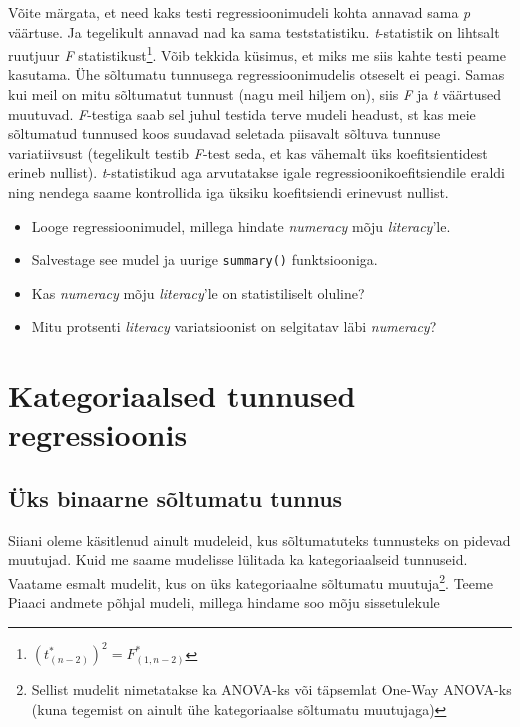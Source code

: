 \documentclass[
]{book}
\providecommand{\tightlist}{%
  \setlength{\itemsep}{0pt}\setlength{\parskip}{0pt}}
\begin{document}
Võite märgata, et need kaks testi regressioonimudeli kohta annavad sama \emph{p} väärtuse. Ja tegelikult annavad nad ka sama teststatistiku. \emph{t}-statistik on lihtsalt ruutjuur \emph{F} statistikust\footnote{\((t^{*}_{(n-2)})^2=F^{*}_{(1,n-2)}\)}. Võib tekkida küsimus, et miks me siis kahte testi peame kasutama. Ühe sõltumatu tunnusega regressioonimudelis otseselt ei peagi. Samas kui meil on mitu sõltumatut tunnust (nagu meil hiljem on), siis \emph{F} ja \emph{t} väärtused muutuvad. \emph{F}-testiga saab sel juhul testida terve mudeli headust, st kas meie sõltumatud tunnused koos suudavad seletada piisavalt sõltuva tunnuse variatiivsust (tegelikult testib \emph{F}-test seda, et kas vähemalt üks koefitsientidest erineb nullist). \emph{t}-statistikud aga arvutatakse igale regressioonikoefitsiendile eraldi ning nendega saame kontrollida iga üksiku koefitsiendi erinevust nullist.

\begin{itemize}
\tightlist
\item
  Looge regressioonimudel, millega hindate \emph{numeracy} mõju \emph{literacy}'le.\\
\item
  Salvestage see mudel ja uurige \texttt{summary()} funktsiooniga.
\item
  Kas \emph{numeracy} mõju \emph{literacy}'le on statistiliselt oluline?\\
\item
  Mitu protsenti \emph{literacy} variatsioonist on selgitatav läbi \emph{numeracy}?
\end{itemize}

\hypertarget{kategoriaalsed-tunnused-regressioonis}{%
\section{Kategoriaalsed tunnused regressioonis}\label{kategoriaalsed-tunnused-regressioonis}}

\hypertarget{uxfcks-binaarne-suxf5ltumatu-tunnus}{%
\subsection{Üks binaarne sõltumatu tunnus}\label{uxfcks-binaarne-suxf5ltumatu-tunnus}}

Siiani oleme käsitlenud ainult mudeleid, kus sõltumatuteks tunnusteks on pidevad muutujad. Kuid me saame mudelisse lülitada ka kategoriaalseid tunnuseid. Vaatame esmalt mudelit, kus on üks kategoriaalne sõltumatu muutuja\footnote{Sellist mudelit nimetatakse ka ANOVA-ks või täpsemlat One-Way ANOVA-ks (kuna tegemist on ainult ühe kategoriaalse sõltumatu muutujaga)}. Teeme Piaaci andmete põhjal mudeli, millega hindame soo mõju sissetulekule
\end{document}
